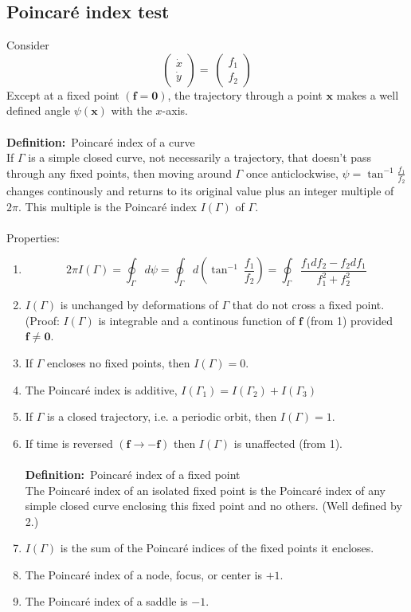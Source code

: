 \documentclass{article}
\newcommand{\definition}{\textbf{Definition:}}              %
\newcommand{\bx}{\bm{x}}                                    %
\begin{document}
\subsection{Poincar\'{e} index test}
Consider 
\[ \left( \begin{array}{c} \dot{x} \\ \dot{y} \end{array} \right) = \
 \left( \begin{array}{c} f_1 \\ f_2 \end{array} \right) \]
Except at a fixed point $(\bm{f} = \bm{0})$, the trajectory through a point
$\bx$ makes a well defined angle $\psi(\bx)$ with the $x$-axis.
\\
\\
\definition\ Poincar\'e index of a curve
\\
If $\Gamma$ is a simple closed curve, not necessarily a trajectory, that
doesn't pass through any fixed points,  then moving around $\Gamma$ once
anticlockwise, $\psi = \tan^{-1} \frac{f_1}{f_2}$ changes continously and
returns to its original value plus an integer multiple of $2\pi$. This multiple
is the Poincar\'e index $I(\Gamma)$ of $\Gamma$.
\\
\\
Properties:
\begin{enumerate}[1.]
\item %
\[ 2\pi I(\Gamma) = \oint_{\Gamma} d\psi = \oint_{\Gamma} d\left( \tan^{-1} \
\frac{f_1}{f_2} \right) = \oint_{\Gamma} \frac{ f_1 df_2 - f_2 df_1}{f_1^2 + f_2^2} \]
\item $I(\Gamma)$ is unchanged by deformations of $\Gamma$ that do not cross 
a fixed point. 
\\
(Proof: $I(\Gamma)$ is integrable and a continous function of $\bm{f}$
(from 1) provided $\bm{f} \neq \bm{0}$.
\item If $\Gamma$ encloses no fixed points, then $I(\Gamma) =0$.
\item The Poincar\'e index is additive,
$I(\Gamma_1) = I(\Gamma_2) + I(\Gamma_3)$
\item If $\Gamma$ is a closed trajectory, i.e. a periodic orbit, then 
$I(\Gamma)=1$. %
\item If time is reversed $(\bm{f} \to -\bm{f})$ then $I(\Gamma)$ is unaffected
(from 1).
\\
\\
\definition\ Poincar\'e index of a fixed point
\\
The Poincar\'e index of an isolated fixed point is the Poincar\'e index of any
simple closed curve enclosing this fixed point and no others. (Well defined by 
2.)
\\
\item $I(\Gamma)$ is the sum of the Poincar\'e indices of the fixed points it 
encloses.
\item The Poincar\'e index of a node, focus, or center is $+1$.
\item The Poincar\'e index of a saddle is $-1$.
\end{enumerate}
\end{document}

